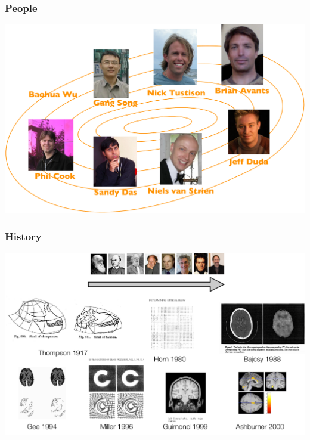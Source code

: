 \documentclass[18pt]{beamer}
\begin{document}
\begin{frame}
\frametitle{People}
\includegraphics[width=\paperwidth]{../figures/ants_contributors.pdf}
\end{frame}

\begin{frame}
\frametitle{History}
\includegraphics[width=\paperwidth]{../figures/ants_history.pdf}
\end{frame}
\end{document}

